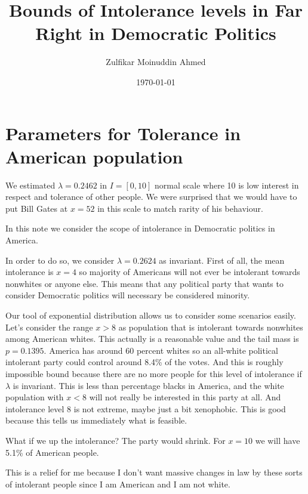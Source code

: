 \documentclass{amsart}
\title{Bounds of Intolerance levels in Far Right in Democratic Politics}
\author{Zulfikar Moinuddin Ahmed}
\date{\today}
\begin{document}
\maketitle

\section{Parameters for Tolerance in American population}

We estimated $\lambda=0.2462$ in $I=[0,10]$ normal scale where 10 is low interest in respect and tolerance of other people.  We were surprised that we would have to put Bill Gates at $x=52$ in this scale to match rarity of his behaviour.  

In this note we consider the scope of intolerance in Democratic politics in America.  

In order to do so, we consider $\lambda=0.2624$ as invariant.  First of all, the mean intolerance is $x=4$ so majority of Americans will not ever be intolerant towards nonwhites or anyone else.  This means that any political party that wants to consider Democratic politics will necessary be considered minority.  

Our tool of exponential distribution allows us to consider some scenarios easily.  Let's consider the range $x>8$ as population that is intolerant towards nonwhites among American whites.  This actually is a reasonable value and the tail mass is $p=0.1395$.  America has around 60 percent whites so an all-white political intolerant party could control around 8.4\% of the votes.  And this is roughly impossible bound because there are no more people for this level of intolerance if $\lambda$ is invariant.  This is less than percentage blacks in America, and the white population with $x<8$ will not really be interested in this party at all.  And intolerance level 8 is not extreme, maybe just a bit xenophobic.  This is good because this tells us immediately what is feasible.  

What if we up the intolerance?  The party would shrink.  For $x=10$ we will have 5.1\% of American people.  

This is a relief for me because I don't want massive changes in law by these sorts of intolerant people since I am American and I am not white.
\end{document}
